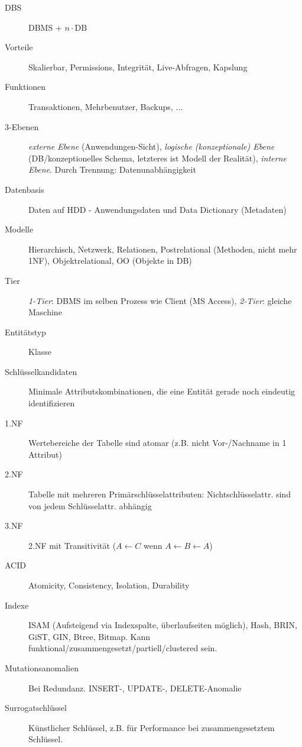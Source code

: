 \documentclass[10pt,landscape,a4paper]{article}
\begin{document}
\begin{multicols*}{3}
\begin{description}
\item[DBS]{DBMS + $n \cdot \mathrm{DB}$}
\item[Vorteile]{Skalierbar, Permissions, Integrität, Live-Abfragen, Kapslung}
\item[Funktionen]{Transaktionen, Mehrbenutzer, Backups, $\ldots$}
\item[3-Ebenen]{\emph{externe Ebene} (Anwendungen-Sicht), \emph{logische (konzeptionale) Ebene}
    (DB/konzeptionelles Schema, letzteres ist Modell der Realität), \emph{interne
    Ebene}. Durch Trennung: Datenunabhängigkeit}
\item[Datenbasis]{Daten auf HDD - Anwendungsdaten und Data Dictionary (Metadaten)}
\item[Modelle]{Hierarchisch, Netzwerk, Relationen, Postrelational (Methoden,
    nicht mehr 1NF), Objektrelational, OO (Objekte in DB)}
\item[Tier]{\emph{1-Tier}: DBMS im selben Prozess wie Client (MS Access), \emph{2-Tier}:
    gleiche Maschine}
\item[Entitätstyp]{Klasse}
\item[Schlüsselkandidaten]{Minimale Attributskombinationen, die eine Entität
    gerade noch eindeutig identifizieren}
\item[1.NF]{Wertebereiche der Tabelle sind atomar (z.B. nicht Vor-/Nachname in 1 Attribut)}
\item[2.NF]{Tabelle mit mehreren Primärschlüsselattributen: Nichtschlüsselattr. sind
    von jedem Schlüsselattr. abhängig}
\item[3.NF]{2.NF mit Transitivität ($A \leftarrow C$ wenn $A \leftarrow B \leftarrow A$)}
\item[ACID]{Atomicity, Consistency, Isolation, Durability}
\item[Indexe]{ISAM (Aufsteigend via Indexspalte, überlaufseiten möglich), Hash, BRIN, GiST, GIN, Btree, Bitmap. Kann funktional/zusammengesetzt/partiell/clustered sein.}
\item[Mutationsanomalien]{Bei Redundanz. INSERT-, UPDATE-, DELETE-Anomalie}
\item[Surrogatschlüssel]{Künstlicher Schlüssel, z.B. für Performance bei
    zusammengesetztem Schlüssel}.
\end{description}


\end{multicols*}
\end{document}
